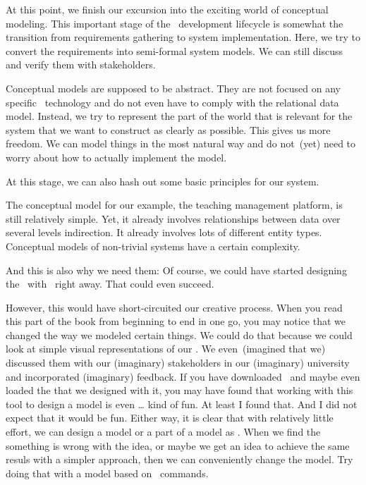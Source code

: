 %
%
At this point, we finish our excursion into the exciting world of conceptual modeling.
This important stage of the \db\ development lifecycle is somewhat the transition from requirements gathering to system implementation.
Here, we try to convert the requirements into semi-formal system models.
We can still discuss and verify them with stakeholders.

Conceptual models are supposed to be abstract.
They are not focused on any specific \db\ technology and do not even have to comply with the relational data model.
Instead, we try to represent the part of the world that is relevant for the system that we want to construct as clearly as possible.
This gives us more freedom.
We can model things in the most natural way and do not~(yet) need to worry about how to actually implement the model.

At this stage, we can also hash out some basic principles for our system.


The conceptual model for our example, the teaching management platform, is still relatively simple.
Yet, it already involves relationships between data over several levels indirection.
It already involves lots of different entity types.
Conceptual models of non-trivial systems have a certain complexity.

And this is also why we need them:
Of course, we could have started designing the \db\ with \sql\ right away.
That could even succeed.

However, this would have short-circuited our creative process.
When you read this part of the book from beginning to end in one go, you may notice that we changed the way we modeled certain things.
We could do that because we could look at simple visual representations of our \db.
We even~(imagined that we) discussed them with our (imaginary) stakeholders in our (imaginary) university and incorporated (imaginary) feedback.
If you have downloaded \yEd\ and maybe even loaded the  that we designed with it, you may have found that working with this tool to design a model is even {\dots} kind of fun.
At least I found that.
And I did not expect that it would be fun.
Either way, it is clear that with relatively little effort, we can design a model or a part of a model as .
When we find the something is wrong with the idea, or maybe we get an idea to achieve the same resuls with a simpler approach, then we can conveniently change the model.
Try doing that with a model based on \sql\ commands.%
%
\endhsection%
%
